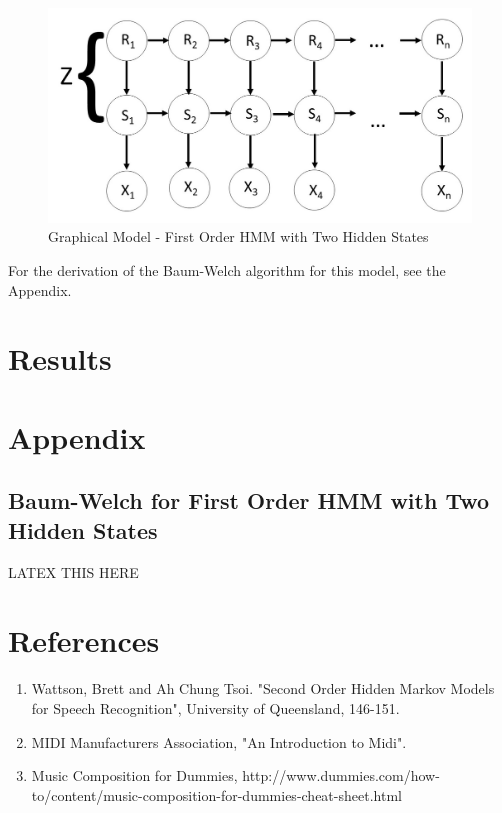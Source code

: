 \documentclass{article} %
\begin{document}
\begin{figure}[H]
\centering
\caption{Graphical Model - First Order HMM with Two Hidden States}
\includegraphics [scale = 0.35] {Model3.jpg}
\end{figure}

For the derivation of the Baum-Welch algorithm for this model, see the Appendix.

\section{Results}


\newpage

\section{Appendix}

\subsection{Baum-Welch for First Order HMM with Two Hidden States}

LATEX THIS HERE

\newpage

\section{References}
\begin{enumerate}
\item Wattson, Brett and Ah Chung Tsoi. "Second Order Hidden Markov Models for Speech Recognition", University of Queensland, 146-151. 
\item MIDI Manufacturers Association, "An Introduction to Midi". 
\item Music Composition for Dummies, http://www.dummies.com/how-to/content/music-composition-for-dummies-cheat-sheet.html
\end{enumerate}
\end{document}
